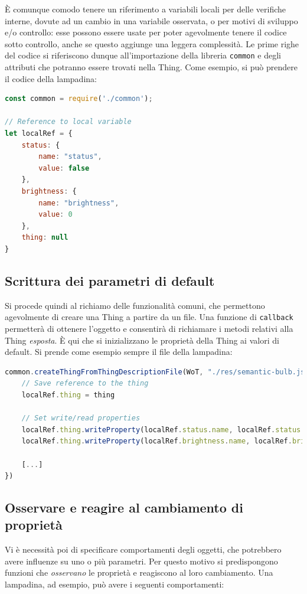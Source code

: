 \documentclass[12pt,a4paper,openright,oneside]{report}
\begin{document}
È comunque comodo tenere un riferimento a variabili locali per delle verifiche interne, dovute ad un cambio in una variabile osservata, o per motivi di sviluppo e/o controllo: esse possono essere usate per poter agevolmente tenere il codice sotto controllo, anche se questo aggiunge una leggera complessità. Le prime righe del codice si riferiscono dunque all'importazione della libreria \texttt{common} e degli attributi che potranno essere trovati nella Thing. Come esempio, si può prendere il codice della lampadina:

\begin{lstlisting}[language=JavaScript,caption={Inizio del codice di \texttt{bulb.js}},label=lst:bulb.js]
const common = require('./common');

// Reference to local variable
let localRef = {
	status: {
		name: "status",
		value: false
	},
	brightness: {
		name: "brightness",
		value: 0
	},
	thing: null
}
\end{lstlisting}

\subsection{Scrittura dei parametri di default}
Si procede quindi al richiamo delle funzionalità comuni, che permettono agevolmente di creare una Thing a partire da un file. Una funzione di \texttt{callback} permetterà di ottenere l'oggetto e consentirà di richiamare i metodi relativi alla Thing \textit{esposta}. È qui che si inizializzano le proprietà della Thing ai valori di default. Si prende come esempio sempre il file della lampadina:

\begin{lstlisting}[language=JavaScript,caption={Creazione della Thing e inizializzazione proprietà read/write in \texttt{bulb.js}}]
common.createThingFromThingDescriptionFile(WoT, "./res/semantic-bulb.json", function(thing) {
	// Save reference to the thing
	localRef.thing = thing
	
	// Set write/read properties
	localRef.thing.writeProperty(localRef.status.name, localRef.status.value)
	localRef.thing.writeProperty(localRef.brightness.name, localRef.brightness.value)
	
	[...]
})
\end{lstlisting}

\subsection{Osservare e reagire al cambiamento di proprietà}
Vi è necessità poi di specificare comportamenti degli oggetti, che potrebbero avere influenze su uno o più parametri. Per questo motivo si predispongono funzioni che \textit{osservano} le proprietà e reagiscono al loro cambiamento. Una lampadina, ad esempio, può avere i seguenti comportamenti:
\end{document}
